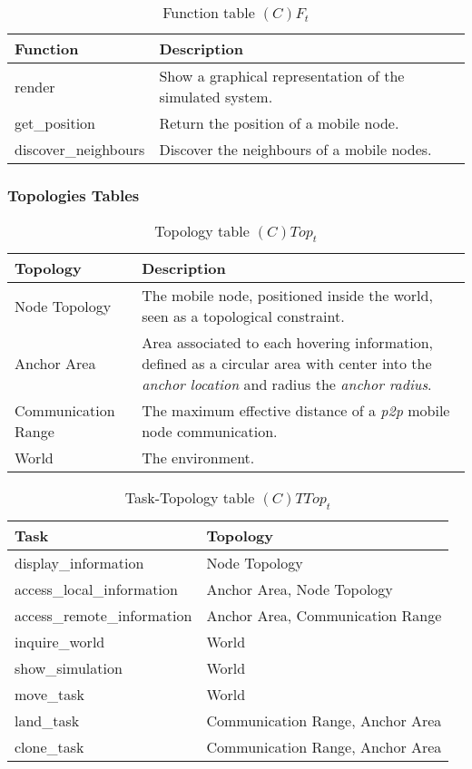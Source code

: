 \begin{table}[H]
	\centering
	\begin{tabular}{|p{5cm}|p{7cm}|}
			\hline
			\textbf{Function} & \textbf{Description} \\
			\hline
			render & Show a graphical representation of the simulated system. \\
			\hline
			get\_position & Return the position of a mobile node. \\
			\hline
			discover\_neighbours & Discover the neighbours of a mobile nodes. \\
			\hline
		\end{tabular}
	\caption{Function table $(C)F_t$}
	\label{tab:cft}
\end{table}

\subsubsection{Topologies Tables}

\begin{table}[H]
	\centering
	\begin{tabular}{|p{4cm}|p{8cm}|}
			\hline
			\textbf{Topology} & \textbf{Description} \\
			\hline
			Node Topology & The mobile node, positioned inside the world, seen
			as a topological constraint. \\
			\hline
			Anchor Area & Area associated to each hovering information, defined as a
			circular area with center into the \emph{anchor location} and radius the
			\emph{anchor radius}.\\
			\hline
			Communication Range & The maximum effective distance of a \emph{p2p}
			mobile node communication. \\
			\hline
			World & The environment. \\
			\hline
		\end{tabular}
	\caption{Topology table $(C)Top_t$}
	\label{tab:ctopt}
\end{table}

\begin{table}[H]
	\centering
	\begin{tabular}{|p{4cm}|p{8cm}|}
			\hline
			\textbf{Task} & \textbf{Topology} \\
			\hline
			display\_information & Node Topology \\
			\hline
			access\_local\_information & Anchor Area, Node Topology\\
			\hline
			access\_remote\_information & Anchor Area, Communication Range\\
			\hline
			inquire\_world & World \\
			\hline
			show\_simulation & World \\
			\hline
			move\_task & World \\
			\hline
			land\_task & Communication Range, Anchor Area\\
			\hline
			clone\_task & Communication Range, Anchor Area\\
			\hline
		\end{tabular}
		\caption{Task-Topology table $(C)TTop_t$}
	\label{tab:cttopt}
\end{table}


